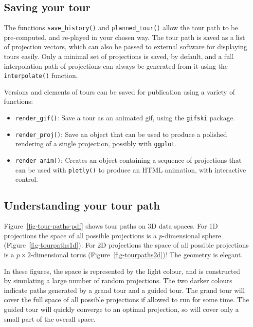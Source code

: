 \documentclass[
  letterpaper,
]{krantz}
\providecommand{\tightlist}{%
  \setlength{\itemsep}{0pt}\setlength{\parskip}{0pt}}\usepackage{longtable,booktabs,array}
\begin{document}
\subsection{Saving your tour}\label{saving-your-tour}

The functions \texttt{save\_history()} and \texttt{planned\_tour()}
allow the tour path to be pre-computed, and re-played in your chosen
way. The tour path is saved as a list of projection vectors, which can
also be passed to external software for displaying tours easily. Only a
minimal set of projections is saved, by default, and a full
interpolation path of projections can always be generated from it using
the \texttt{interpolate()} function.

Versions and elements of tours can be saved for publication using a
variety of functions:

\begin{itemize}
\tightlist
\item
  \texttt{render\_gif()}: Save a tour as an animated gif, using the
  \texttt{gifski} package.
\item
  \texttt{render\_proj()}: Save an object that can be used to produce a
  polished rendering of a single projection, possibly with
  \texttt{ggplot}.
\item
  \texttt{render\_anim()}: Creates an object containing a sequence of
  projections that can be used with \texttt{plotly()} to produce an HTML
  animation, with interactive control.
\end{itemize}

\subsection{Understanding your tour
path}\label{understanding-your-tour-path}

Figure~\ref{fig-tour-paths-pdf} shows tour paths on 3D data spaces. For
1D projections the space of all possible projections is a
\(p\)-dimensional sphere (Figure~\ref{fig-tourpaths1d}). For 2D
projections the space of all possible projections is a
\(p\times 2\)-dimensional torus (Figure~\ref{fig-tourpaths2d})! The
geometry is elegant.

In these figures, the space is represented by the light colour, and is
constructed by simulating a large number of random projections. The two
darker colours indicate paths generated by a grand tour and a guided
tour. The grand tour will cover the full space of all possible
projections if allowed to run for some time. The guided tour will
quickly converge to an optimal projection, so will cover only a small
part of the overall space.
\end{document}
